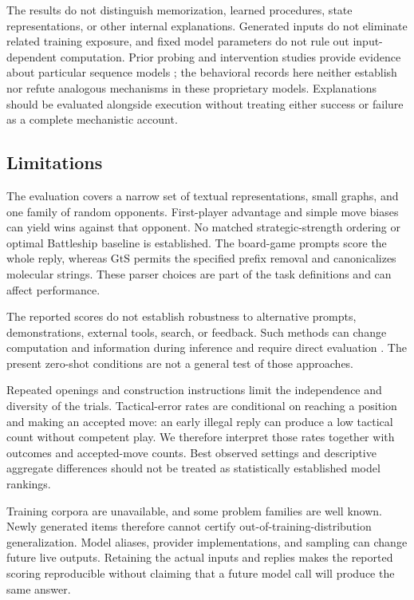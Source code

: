 \documentclass[12pt,letterpaper]{article}
\begin{document}
The results do not distinguish memorization, learned procedures, state representations, or other internal explanations. Generated inputs do not eliminate related training exposure, and fixed model parameters do not rule out input-dependent computation. Prior probing and intervention studies provide evidence about particular sequence models \cite{li2023emergent,nanda2023linear}; the behavioral records here neither establish nor refute analogous mechanisms in these proprietary models. Explanations should be evaluated alongside execution without treating either success or failure as a complete mechanistic account.

\subsection*{Limitations}
The evaluation covers a narrow set of textual representations, small graphs, and one family of random opponents. First-player advantage and simple move biases can yield wins against that opponent. No matched strategic-strength ordering or optimal Battleship baseline is established. The board-game prompts score the whole reply, whereas GtS permits the specified prefix removal and canonicalizes molecular strings. These parser choices are part of the task definitions and can affect performance.

The reported scores do not establish robustness to alternative prompts, demonstrations, external tools, search, or feedback. Such methods can change computation and information during inference and require direct evaluation \cite{DBLP:journals/corr/abs-2201-11903,yao2023treethoughtsdeliberateproblem}. The present zero-shot conditions are not a general test of those approaches.

Repeated openings and construction instructions limit the independence and diversity of the trials. Tactical-error rates are conditional on reaching a position and making an accepted move: an early illegal reply can produce a low tactical count without competent play. We therefore interpret those rates together with outcomes and accepted-move counts. Best observed settings and descriptive aggregate differences should not be treated as statistically established model rankings.

Training corpora are unavailable, and some problem families are well known. Newly generated items therefore cannot certify out-of-training-distribution generalization. Model aliases, provider implementations, and sampling can change future live outputs. Retaining the actual inputs and replies makes the reported scoring reproducible without claiming that a future model call will produce the same answer.
\end{document}
